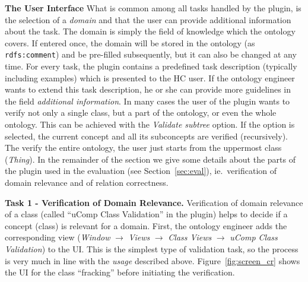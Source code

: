 \textbf{The User Interface}
What is common among all tasks handled by the plugin, is the selection of a \emph{domain} and that the user can provide
additional information about the task. The domain is simply the field of knowledge which the ontology covers. If entered
once, the domain will be stored in the ontology (as \texttt{rdfs:comment}) and be pre-filled subsequently, but it can also be changed at any time.
For every task, the plugin contains a predefined task description (typically including examples) which is presented to the HC user.
If the ontology engineer wants to extend this task description, he or she can provide more guidelines in the field \emph{additional information}.
In many cases the user of the plugin wants to verify not only a single class, but a part of the ontology, or even the whole ontology.
This can be achieved with the \emph{Validate subtree} option. If the option is selected, the current concept and all its subconcepts 
are verified (recursively). The verify the entire ontology, the user just starts from the uppermost class (\emph{Thing}).
In the remainder of the section we give some details about the parts of the plugin used in the evaluation (see Section~\ref{sec:eval}),
ie.~verification of domain relevance and of relation correctness.



\textbf{Task 1 - Verification of Domain Relevance.}
Verification of domain relevance of a class (called ``uComp Class Validation'' in the plugin) helps to decide if a concept (class) is relevant for a domain. 
First, the ontology engineer adds the corresponding view (\emph{Window} $\rightarrow{}$ \emph{Views} $\rightarrow{}$ \emph{Class Views} $\rightarrow{}$ \emph{uComp Class Validation}) to the UI.
This is the simplest type of validation task, so the process is very much in line with the \emph{usage} described above.
Figure~\ref{fig:screen_cr} shows the UI for the class ``fracking'' before initiating the verification. 

